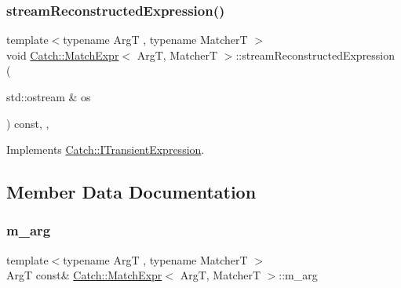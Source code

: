 \subsubsection{\texorpdfstring{streamReconstructedExpression()}{streamReconstructedExpression()}}
{\footnotesize\ttfamily template$<$typename ArgT , typename MatcherT $>$ \\
void \mbox{\hyperlink{class_catch_1_1_match_expr}{Catch\+::\+Match\+Expr}}$<$ ArgT, MatcherT $>$\+::stream\+Reconstructed\+Expression (\begin{DoxyParamCaption}\item[{std\+::ostream \&}]{os }\end{DoxyParamCaption}) const\hspace{0.3cm}{\ttfamily [inline]}, {\ttfamily [override]}, {\ttfamily [virtual]}}



Implements \mbox{\hyperlink{struct_catch_1_1_i_transient_expression_aabe1889df9c6e639a24afb08d8a0fe9e}{Catch\+::\+I\+Transient\+Expression}}.



\subsection{Member Data Documentation}
\mbox{\label{class_catch_1_1_match_expr_afb77e2fbf49f956d27f8617a70cf7118}} 
\subsubsection{\texorpdfstring{m\_arg}{m\_arg}}
{\footnotesize\ttfamily template$<$typename ArgT , typename MatcherT $>$ \\
ArgT const\& \mbox{\hyperlink{class_catch_1_1_match_expr}{Catch\+::\+Match\+Expr}}$<$ ArgT, MatcherT $>$\+::m\+\_\+arg\hspace{0.3cm}{\ttfamily [private]}}

\mbox{\label{class_catch_1_1_match_expr_a4dea78586dd2b3268b4a186e7c0adbe2}} 
